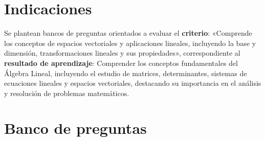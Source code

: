 \documentclass[a4,11pt]{aleph-notas}
\begin{document}
\encabezado

\vspace*{-8mm}
\tableofcontents

\section{Indicaciones}

Se plantean bancos de preguntas orientados a evaluar el \textbf{criterio}: «Comprende los conceptos de espacios vectoriales y aplicaciones lineales, incluyendo la base y dimensión, transformaciones lineales y sus propiedades», correspondiente al \textbf{resultado de aprendizaje}: Comprender los conceptos fundamentales del Álgebra Lineal, incluyendo el estudio de matrices, determinantes, sistemas de ecuaciones lineales y espacios vectoriales, destacando su importancia en el análisis y resolución de problemas matemáticos.

\section{Banco de preguntas}
\end{document}
